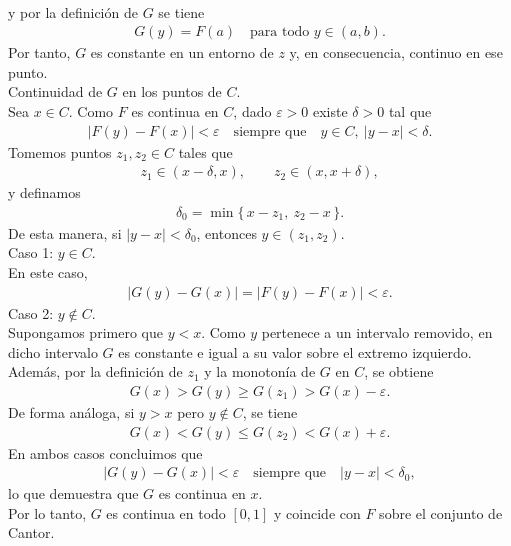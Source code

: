 \begin{solucion}
\begin{enumerate}[a)]
\begin{align*}
      \end{align*}
      y por la definición de $G$ se tiene
      \begin{align*}
        G(y)=F(a)\quad \text{para todo } y\in(a,b).       
      \end{align*}
      Por tanto, $G$ es constante en un entorno de $z$ y, en consecuencia, continuo en ese punto.\\
      Continuidad de $G$ en los puntos de $C$.\\
      Sea $x\in C$. Como $F$ es continua en $C$, dado $\varepsilon>0$ existe $\delta>0$ tal que 
      \begin{align*}
        |F(y)-F(x)|<\varepsilon \quad\text{siempre que}\quad y\in C,\ |y-x|<\delta.
      \end{align*}
      Tomemos puntos $z_1,z_2\in C$ tales que
      \begin{align*}
        z_1\in(x-\delta,x),\qquad z_2\in(x,x+\delta),       
      \end{align*}
      y definamos
      \begin{align*}
        \delta_0=\min\{\,x-z_1,\ z_2-x\,\}.       
      \end{align*}
      De esta manera, si $|y-x|<\delta_0$, entonces $y\in(z_1,z_2)$.\\
      Caso 1: $y\in C$.\\
      En este caso,
      \begin{align*}
        |G(y)-G(x)| = |F(y)-F(x)|<\varepsilon.       
      \end{align*}
      Caso 2: $y\notin C$.\\
      Supongamos primero que $y<x$. Como $y$ pertenece a un intervalo removido, en dicho intervalo $G$ es constante e igual a su valor sobre el extremo izquierdo. Además, por la definición de $z_1$ y la monotonía de $G$ en $C$, se obtiene
      \begin{align*}
        G(x) > G(y) \ge G(z_1) > G(x)-\varepsilon.
      \end{align*}
      De forma análoga, si $y>x$ pero $y\notin C$, se tiene
      \begin{align*}
        G(x) < G(y) \le G(z_2) < G(x)+\varepsilon.
      \end{align*}
      En ambos casos concluimos que
      \begin{align*}
        |G(y)-G(x)|<\varepsilon \quad\text{siempre que}\quad |y-x|<\delta_0, 
      \end{align*}
      lo que demuestra que $G$ es continua en $x$.\\
      Por lo tanto, $G$ es continua en todo $[0,1]$ y coincide con $F$ sobre el conjunto de Cantor.
  \end{enumerate}
\end{solucion}
